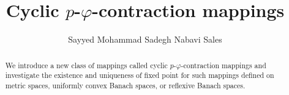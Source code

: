\documentclass{amsart}
\theoremstyle{definition}
\theoremstyle{remark}
\begin{document}
\title{ Cyclic $p$-$\varphi$-contraction mappings}

\author[S. M. S. Nabavi Sales]{Sayyed Mohammad Sadegh  Nabavi Sales}
\address{ Department of Mathematics and Computer Science, Hakim Sabzevari University, P.O. Box 397, Sabzevar, Iran.}

\date{}



\begin{abstract}
We introduce a new class of mappings called cyclic $p$-$\varphi$-contraction mappings and investigate the existence and uniqueness of fixed point for such mappings defined on metric spaces, uniformly convex Banach spaces, or reflexive Banach spaces.
\end{abstract}

 \maketitle
\end{document}
